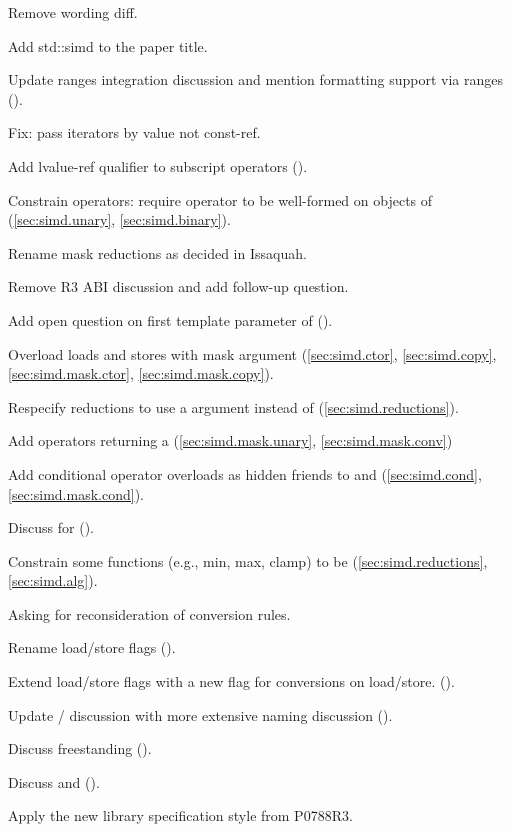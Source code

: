 \begin{revision}
\item Remove wording diff.
\item Add std::simd to the paper title.
\item Update ranges integration discussion and mention formatting support via
  ranges ().
\item Fix: pass iterators by value not const-ref.
\item Add lvalue-ref qualifier to subscript operators ().
\item Constrain  operators: require operator to be well-formed on objects of  (\ref{sec:simd.unary}, \ref{sec:simd.binary}).
\item Rename mask reductions as decided in Issaquah.
\item Remove R3 ABI discussion and add follow-up question.
\item Add open question on first template parameter of  ().
\item Overload loads and stores with mask argument (\ref{sec:simd.ctor}, \ref{sec:simd.copy}, \ref{sec:simd.mask.ctor}, \ref{sec:simd.mask.copy}).
\item Respecify \simd reductions to use a \mask argument instead of  (\ref{sec:simd.reductions}).
\item Add \mask operators returning a \simd (\ref{sec:simd.mask.unary}, \ref{sec:simd.mask.conv})
\item Add conditional operator overloads as hidden friends to \simd and \mask
  (\ref{sec:simd.cond}, \ref{sec:simd.mask.cond}).
\item Discuss \std{} for \simd ().
\item Constrain some functions (e.g., min, max, clamp) to be  (\ref{sec:simd.reductions}, \ref{sec:simd.alg}).
\item Asking for reconsideration of conversion rules.
\item Rename load/store flags ().
\item Extend load/store flags with a new flag for conversions on load/store. ().
\item Update / discussion with more extensive naming discussion ().
\item Discuss freestanding \simd ().
\item Discuss  and  ().
\item Apply the new library specification style from P0788R3.
\end{revision}

